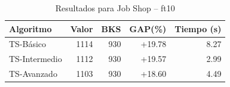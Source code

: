 \begin{table}[h]
\centering
\caption{Resultados para Job Shop -- ft10}
\label{tab:jobshop_ft10}
\begin{tabular}{lrrrr}
\hline
\textbf{Algoritmo} & \textbf{Valor} & \textbf{BKS} & \textbf{GAP(\%)} & \textbf{Tiempo (s)} \\
\hline
TS-Básico & 1114 & 930 & +19.78 & 8.27 \\
TS-Intermedio & 1112 & 930 & +19.57 & 2.99 \\
TS-Avanzado & 1103 & 930 & +18.60 & 4.49 \\
\hline
\end{tabular}
\end{table}
